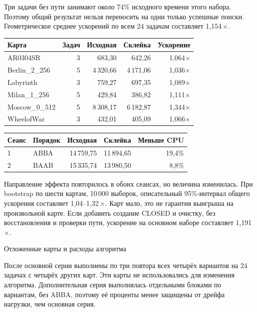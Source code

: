 \documentclass[11pt,a4paper]{article}
\begin{document}
Три задачи без пути занимают около 74\% исходного времени этого набора. Поэтому общий результат нельзя переносить на одни только успешные поиски. Геометрическое среднее ускорений по всем 24 задачам составляет 1,154\,$\times$.

\begin{center}\small
\begin{tabular}{@{}lrrrr@{}}
\toprule
Карта & Задач & Исходная & Склейка & Ускорение \\
\midrule
AR0304SR & 3 & 683,30 & 642,26 & 1,064$\times$ \\
Berlin\_2\_256 & 5 & 4\,320,66 & 4\,171,06 & 1,036$\times$ \\
Labyrinth & 3 & 759,27 & 697,35 & 1,089$\times$ \\
Milan\_1\_256 & 5 & 429,84 & 386,82 & 1,111$\times$ \\
Moscow\_0\_512 & 5 & 8\,308,17 & 6\,182,87 & 1,344$\times$ \\
WheelofWar & 3 & 432,01 & 405,09 & 1,066$\times$ \\
\bottomrule
\end{tabular}
\end{center}

\begin{center}\small
\begin{tabular}{@{}llrrr@{}}
\toprule
Сеанс & Порядок & Исходная & Склейка & Меньше CPU \\
\midrule
1 & ABBA & 14\,759,75 & 11\,894,65 & 19,4\% \\
2 & BAAB & 15\,335,74 & 13\,980,50 & 8,8\% \\
\bottomrule
\end{tabular}
\end{center}

Направление эффекта повторилось в обоих сеансах, но величина изменилась. При bootstrap по шести картам, 10\,000 выборок, описательный 95\%-интервал общего ускорения составляет 1,04--1,32\,$\times$. Карт мало, это не гарантия выигрыша на произвольной карте. Если добавить создание CLOSED и очистку, без восстановления и проверки пути, ускорение на основном наборе составляет 1,191\,$\times$.

\newpage
{\Large Отложенные карты и расходы алгоритма}\par

После основной серии выполнены по три повтора всех четырёх вариантов на 24 задачах с четырёх других карт. Эти карты не использовались для изменения алгоритма. Дополнительная серия выполнялась отдельными блоками по вариантам, без ABBA, поэтому её проценты менее защищены от дрейфа нагрузки, чем основная серия.
\end{document}
